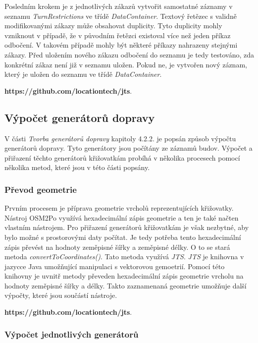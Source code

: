 Posledním krokem je z jednotlivých zákazů vytvořit samostatné záznamy v seznamu \textit{TurnRestrictions} ve třídě \textit{DataContainer}. Textový řetězec s validně modifikovanými zákazy může obsahovat duplicity. Tyto duplicity mohly vzniknout v případě, že v původním řetězci existoval více než jeden příkaz odbočení. V takovém případě mohly být některé příkazy nahrazeny stejnými zákazy. Před uložením nového zákazu odbočení do seznamu je tedy testováno, zda konkrétní zákaz není již v seznamu uložen. Pokud ne, je vytvořen nový záznam, který je uložen do seznamu ve třídě \textit{DataContainer}.


\textbf{https://github.com/locationtech/jts}. 

\subsection{Výpočet generátorů dopravy}

V části \textit{Tvorba generátorů dopravy} kapitoly 4.2.2. je popsán způsob výpočtu generátorů dopravy. Tyto generátory jsou počítány ze záznamů budov. Výpočet a přiřazení těchto generátorů křižovatkám probíhá v několika procesech pomocí několika metod, které jsou v této části popsány.

\subsubsection{Převod geometrie}

Prvním procesem je příprava geometrie vrcholů reprezentujících křižovatky. Nástroj OSM2Po využívá hexadecimální zápis geometrie a ten je také načten vlastním nástrojem. Pro přiřazení generátorů křižovatkám je však nezbytné, aby bylo možné s prostorovými daty počítat. Je tedy potřeba tento hexadecimální zápis převést na hodnoty zeměpisné šířky a zeměpisné délky. O to se stará metoda \textit{convertToCoordinates()}. Tato metoda využívá \textit{JTS}. \textit{JTS} je knihovna v jazycce Java umožňující manipulaci s vektorovou gemoetrií. Pomocí této knihovny je uvnitř metody převeden hexadecimální zápis geometrie vrcholu na hodnoty zeměpisné šířky a délky. Takto zaznamenaná geometrie umožňuje další výpočty, které jsou součástí nástroje.

\textbf{https://github.com/locationtech/jts}. 

\subsubsection{Výpočet jednotlivých generátorů}

